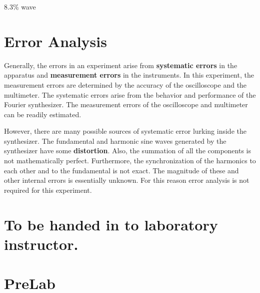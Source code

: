 \begin{marginfigure}
\caption*{8.3\% wave}
\label{fig:fs16}
\end{marginfigure}

\section{Error Analysis}

Generally, the errors in an experiment arise from {\bf systematic errors} in the apparatus and {\bf measurement errors} in the instruments. In this experiment, the measurement errors are determined by the accuracy of the oscilloscope and the multimeter. The systematic errors arise from the behavior and performance of the Fourier synthesizer. The measurement errors of the oscilloscope and multimeter can be readily estimated.

However, there are many possible sources of systematic error lurking inside the synthesizer. The fundamental and harmonic sine waves generated by the synthesizer have some {\bf distortion}. Also, the summation of all the components is not mathematically perfect. Furthermore, the synchronization of the harmonics to each other and to the fundamental is not exact. The magnitude of these and other internal errors is essentially unknown. For this reason error analysis is not required for this experiment.

\section{To be handed in to laboratory instructor.}

\section{PreLab}

